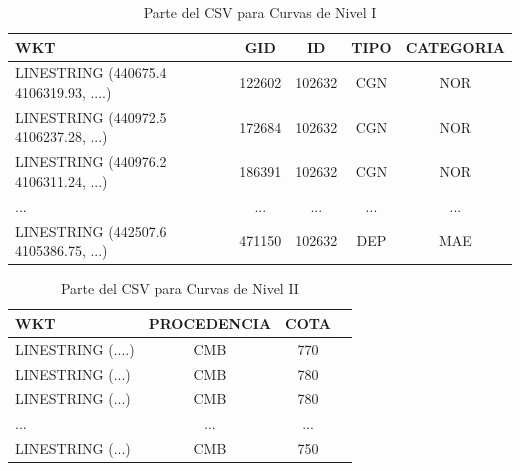\begin{table}[H]
	\centering
	\caption{Parte del CSV para Curvas de Nivel I}
	\label{csv-curva1}
	\begin{tabular}{|m{4.2cm}|c|c|c|c|}
		\hline
		\rowcolor[HTML]{EFEFEF} 
		\textbf{WKT} & \textbf{GID} & \textbf{ID} & \textbf{TIPO} & \textbf{CATEGORIA}  \\ \hline
		LINESTRING (440675.4 4106319.93, ....)       & 122602       & 102632            & CGN           & NOR                           \\ \hline
		LINESTRING (440972.5 4106237.28, ...)     & 172684       & 102632            & CGN           & NOR                       \\ \hline
		LINESTRING (440976.2 4106311.24, ...)              & 186391       & 102632            & CGN           & NOR                        \\ \hline
		...                                & ...       & ...            & ...           & ...                      \\ \hline
		
		LINESTRING (442507.6 4105386.75, ...)             & 471150       & 102632            & DEP           & MAE                       \\ \hline
	\end{tabular}
\end{table}

\begin{table}[H]
	\centering
	\caption{Parte del CSV para Curvas de Nivel II}
	\label{csv-curvas2}
	\begin{tabular}{|m{4.2cm}|c|c|c|}
		\hline
		\rowcolor[HTML]{EFEFEF} 
		\textbf{WKT}  & \textbf{PROCEDENCIA} & \textbf{COTA} \\ \hline
		LINESTRING (....)                  & CMB                 & 770           \\ \hline
		LINESTRING (...)                   & CMB                 & 780           \\ \hline
		LINESTRING (...)                      & CMB                 & 780           \\ \hline
		...                                & ...       & ...                  \\ \hline
		
		LINESTRING (...)                              & CMB                 & 750           \\ \hline
	\end{tabular}
\end{table}

